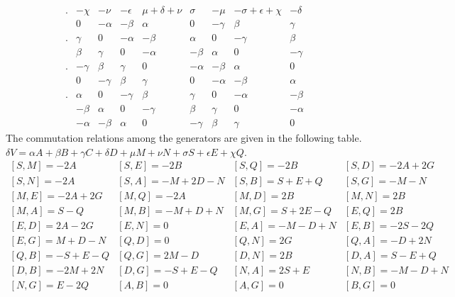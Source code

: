 \documentclass[12pt]{article}
\begin{document}
\begin{displaymath}
\begin{array}{ccccccccc}
. & -\chi &-\nu &-\epsilon &\mu+\delta+\nu& \sigma&-\mu&-\sigma+\epsilon+\chi&-\delta \\
 & 0& -\alpha& -\beta& \alpha& 0 & -\gamma& \beta& \gamma \\
. & \gamma & 0& -\alpha& -\beta& \alpha& 0& -\gamma& \beta \\
 & \beta& \gamma& 0& -\alpha& -\beta& \alpha& 0& -\gamma \\
. & -\gamma& \beta& \gamma& 0& -\alpha& -\beta& \alpha& 0 \\
 & 0& -\gamma& \beta& \gamma& 0& -\alpha& -\beta& \alpha \\
. & \alpha& 0& -\gamma& \beta& \gamma& 0& -\alpha& -\beta \\
 & -\beta& \alpha& 0& -\gamma& \beta& \gamma& 0& -\alpha \\
 & -\alpha& -\beta& \alpha& 0& -\gamma& \beta& \gamma& 0
\end{array}
\end{displaymath}
 The commutation relations among the generators are given in the
following table.  $\delta V = \alpha A + \beta B + \gamma C +
\delta D + \mu M + \nu N + \sigma S + \epsilon E + \chi Q$.
\begin{displaymath}
\begin{array}{cccc}
\left[S,M\right]=-2A & \left[S,E\right]=-2B & \left[S,Q\right]=-2B & \left[S,D\right]=-2A+2G \\
\left[S,N\right]=-2A & \left[S,A\right]=-M+2D-N & \left[S,B\right]=S+E+Q & \left[S,G\right]=-M-N \\
\left[M,E\right]=-2A+2G & \left[M,Q\right]=-2A & \left[M,D\right]=2B & \left[M,N\right]=2B \\
\left[M,A\right]=S-Q & \left[M,B\right]=-M+D+N & \left[M,G\right]=S+2E-Q & \left[E,Q\right]=2B \\
\left[E,D\right]=2A-2G & \left[E,N\right]=0 & \left[E,A\right]=-M-D+N & \left[E,B\right]=-2S-2Q \\
\left[E,G\right]=M+D-N & \left[Q,D\right]=0 & \left[Q,N\right]=2G & \left[Q,A\right]=-D+2N \\
\left[Q,B\right]=-S+E-Q & \left[Q,G\right]=2M-D & \left[D,N\right]=2B & \left[D,A\right]=S-E+Q \\
\left[D,B\right]=-2M+2N & \left[D,G\right]=-S+E-Q & \left[N,A\right]=2S+E & \left[N,B\right]=-M-D+N \\
\left[N,G\right]=E-2Q & \left[A,B\right]=0 & \left[A,G\right]=0 & \left[B,G\right]=0
\end{array}
\end{displaymath}
\end{document}

